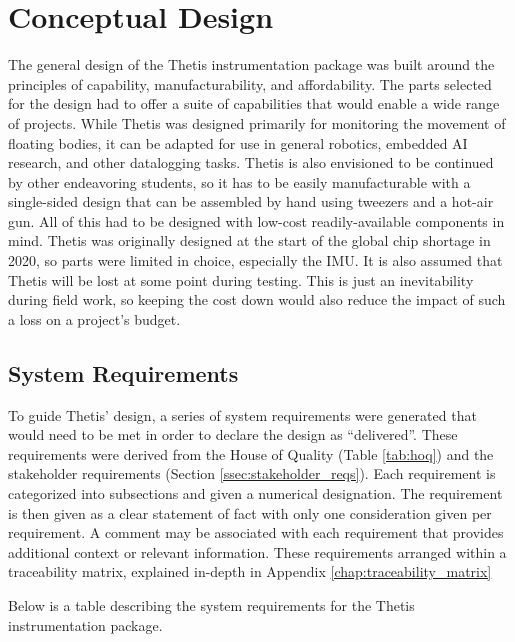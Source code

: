\section{Conceptual Design} 
The general design of the Thetis instrumentation package was built around the principles of capability, manufacturability, and affordability.
The parts selected for the design had to offer a suite of capabilities that would enable a wide range of projects.
While Thetis was designed primarily for monitoring the movement of floating bodies, it can be adapted for use in general robotics, embedded AI research, and other datalogging tasks.
Thetis is also envisioned to be continued by other endeavoring students, so it has to be easily manufacturable with a single-sided design that can be assembled by hand using tweezers and a hot-air gun.
All of this had to be designed with low-cost readily-available components in mind.
Thetis was originally designed at the start of the global chip shortage in 2020, so parts were limited in choice, especially the IMU.
It is also assumed that Thetis will be lost at some point during testing.
This is just an inevitability during field work, so keeping the cost down would also reduce the impact of such a loss on a project's budget.

\subsection{System Requirements} 
To guide Thetis' design, a series of system requirements were generated that would need to be met in order to declare the design as ``delivered''.
These requirements were derived from the House of Quality (Table \ref{tab:hoq}) and the stakeholder requirements (Section \ref{ssec:stakeholder_reqs}).
Each requirement is categorized into subsections and given a numerical designation.
The requirement is then given as a clear statement of fact with only one consideration given per requirement.
A comment may be associated with each requirement that provides additional context or relevant information.
These requirements arranged within a traceability matrix, explained in-depth in Appendix \ref{chap:traceability_matrix}						

Below is a table describing the system requirements for the Thetis instrumentation package.



